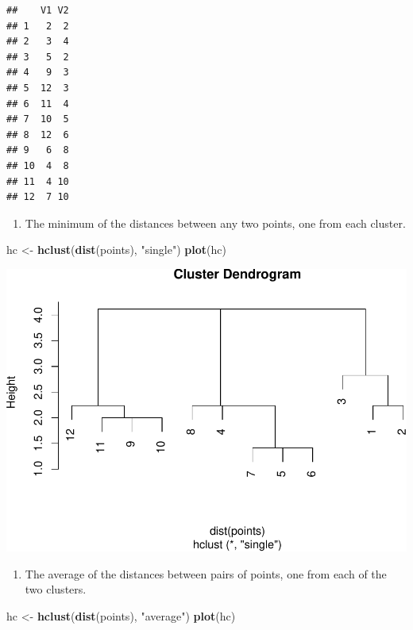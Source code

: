 \documentclass[]{article}
\newenvironment{Shaded}{\begin{snugshade}}{\end{snugshade}}
\newcommand{\KeywordTok}[1]{\textcolor[rgb]{0.13,0.29,0.53}{\textbf{{#1}}}}
\newcommand{\StringTok}[1]{\textcolor[rgb]{0.31,0.60,0.02}{{#1}}}
\newcommand{\NormalTok}[1]{{#1}}
\begin{document}
\begin{verbatim}
##    V1 V2
## 1   2  2
## 2   3  4
## 3   5  2
## 4   9  3
## 5  12  3
## 6  11  4
## 7  10  5
## 8  12  6
## 9   6  8
## 10  4  8
## 11  4 10
## 12  7 10
\end{verbatim}

\begin{enumerate}
\def\labelenumi{(\alph{enumi})}
\itemsep1pt\parskip0pt
\item
  The minimum of the distances between any two points, one from each
  cluster.
\end{enumerate}

\begin{Shaded}
\begin{Highlighting}[]
\NormalTok{hc <-}\StringTok{ }\KeywordTok{hclust}\NormalTok{(}\KeywordTok{dist}\NormalTok{(points), }\StringTok{"single"}\NormalTok{)}
\KeywordTok{plot}\NormalTok{(hc)}
\end{Highlighting}
\end{Shaded}

\includegraphics{arancibia_week8_hw_files/figure-latex/unnamed-chunk-3-1.pdf}

\begin{enumerate}
\def\labelenumi{(\alph{enumi})}
\setcounter{enumi}{1}
\itemsep1pt\parskip0pt
\item
  The average of the distances between pairs of points, one from each of
  the two clusters.
\end{enumerate}

\begin{Shaded}
\begin{Highlighting}[]
\NormalTok{hc <-}\StringTok{ }\KeywordTok{hclust}\NormalTok{(}\KeywordTok{dist}\NormalTok{(points), }\StringTok{"average"}\NormalTok{)}
\KeywordTok{plot}\NormalTok{(hc)}
\end{Highlighting}
\end{Shaded}
\end{document}
